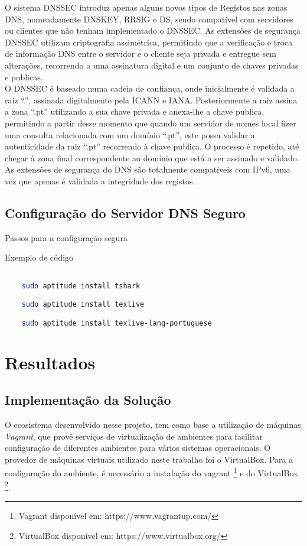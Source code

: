 \documentclass[12pt,openright,a4paper]{report}
\begin{document}
{O sistema DNSSEC introduz apenas alguns novos tipos de Registos nas zonas DNS, nomeadamente DNSKEY, RRSIG e DS, sendo compatível com servidores ou clientes que não tenham implementado o DNSSEC. As extensões de segurança DNSSEC utilizam criptografia assimétrica, permitindo que a verificação e troca de informação DNS entre o servidor e o cliente seja privada e entregue sem alterações, recorrendo a uma assinatura digital e um conjunto de chaves privadas e publicas.\\

O DNSSEC é baseado numa cadeia de confiança, onde inicialmente é validada a raiz “.”, assinada digitalmente pela ICANN e IANA. Posteriormente a raiz assina a zona “.pt” utilizando a sua chave privada e anexa-lhe a chave publica, permitindo a partir desse momento que quando um servidor de nomes local fizer uma consulta relacionada com um domínio “.pt”, este possa validar a autenticidade da raiz “.pt” recorrendo à chave publica. O processo é repetido, até chegar à zona final correspondente ao domínio que está a ser assinado e validado. As extensões de segurança do DNS são totalmente compatíveis com IPv6, uma vez que apenas é validada a integridade dos registos.

\section{Configuração do Servidor DNS Seguro}
\label{sec_config_segura}

Passos para a configuração segura

Exemplo de código
\begin{lstlisting}[language=bash]

	sudo aptitude install tshark

	sudo aptitude install texlive

	sudo aptitude install texlive-lang-portuguese

\end{lstlisting}

\chapter{Resultados}

\section{Implementação da Solução}
O ecosistema desenvolvido nesse projeto, tem como base a utilização de máquinas \textit{Vagrant}, que provê serviços de virtualização de ambientes para facilitar configuração de diferentes ambientes para vários sistemas operacionais. O provedor de máquinas virtuais utilizado neste trabalho foi o VirtualBox. Para a configuração do ambiente, é necessário a instalação do vagrant \footnote{Vagrant disponível em: https://www.vagrantup.com/} e do VirtualBox \footnote{VirtualBox disponível em: https://www.virtualbox.org/}.\\

}
\end{document}
